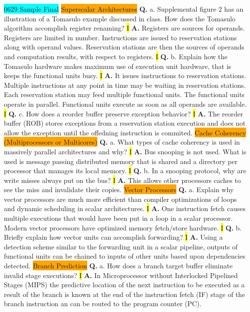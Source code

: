 \documentclass[fontsize=4pt]{scrartcl}
\begin{document}
\colorbox{Cyan}{0629 Sample Final}
\colorbox{Orange}{Superscalar Architectures}
\textbf{Q.} a. Supplemental figure 2 has an illustration of a Tomasulo example discussed in class. How does the Tomasulo algorithm accomplish register renaming? 
\hl{I}
\textbf{A.} Registers are sources for operands. Registers are limited in number. Instructions are issued to reservation stations along with operand values. Reservation stations are then the sources of operands and computation results, with respect to registers.
\hl{I}
\textbf{Q.} b. Explain how the Tomasulo hardware makes maximum use of execution unit hardware, that is keeps the functional units busy.
\hl{I}
\textbf{A.} It issues instructions to reservation stations. Multiple instructions at any point in time may be waiting in reservation stations. Each reservation station may feed multiple functional units. The functional units operate in parallel. Functional units execute as soon as all operands are available.
\hl{I}
\textbf{Q.} c. How does a reorder buffer preserve exception behavior?
\hl{I}
\textbf{A.} The reorder buffer (ROB) stores exceptions from a reservation station execution and does not allow the exception until the offedning instruction is commited.
\colorbox{Orange}{Cache Coherency (Multiprocessors or Multicores)} 
\textbf{Q.} a. What types of cache coherency is used in massively parallel architectures and why?
\hl{I}
\textbf{A.} Bus snooping is not used. What is used is message passing distributed memory that is shared and a directory per processor that manages its local memory.
\hl{I}
\textbf{Q.} b. In a snooping protocol, why are write misses always put on the bus?
\hl{I}
\textbf{A.} This allows other processors caches to see the miss and invalidate their copies.
\colorbox{Orange}{Vector Processors}
\textbf{Q.} a. Explain why vector processors are much more efficient than compiler optimizations of loops and dynamic scheduling in scalar architectures.
\hl{I}
\textbf{A.} One instruction fetch causes multiple executions that would have been put in a loop in a scalar processor. Modern vector processors have optimized memory fetch/store hardware.
\hl{I}
\textbf{Q.} b. Briefly explain how vector units can accomplish forwarding?
\hl{I}
\textbf{A.} Using  a detection scheme similar to the forwarding unit in a scalar pipeline, outputs of functional units can be chained to inputs of other units based upon dependencies detected.
\colorbox{Orange}{Branch Prediction}
\textbf{Q.} a. How does a branch target buffer eliminate invalid stage executions? 
\hl{I}
\textbf{A.} In Microprocessor without Interlocked Pipelined Stages (MIPS) the predictive location of the next instruction to be executed as a result of the branch is known at the end of the instruction fetch (IF) stage of the branch instruction an can be routed to the program counter (PC).
\end{document}
